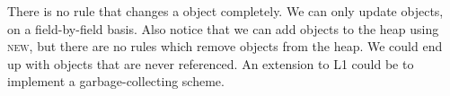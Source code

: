 \frmrule

There is no rule that changes a object completely.
We can only update objects, on a field-by-field basis.
Also notice that we can add objects to the heap using \textsc{new},
but there are no rules which remove objects from the heap. 
We could end up with objects that are never referenced. 
An extension to L1 could be to implement a garbage-collecting scheme.


